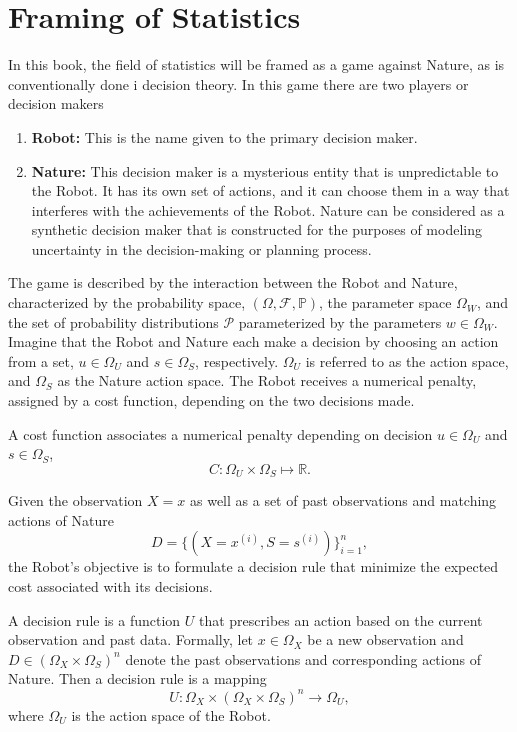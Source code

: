 \section{Framing of Statistics}
\label{sec:framing_statistics}
In this book, the field of statistics will be framed as a game against Nature, as is conventionally done i decision theory. In this game there are two players or decision makers
\begin{enumerate}
	\item \textbf{Robot:} This is the name given to the primary decision maker.
	
	\item \textbf{Nature:} This decision maker is a mysterious entity that is unpredictable to the Robot. It has its own set of actions, and it can choose them in a way that interferes with the achievements of the Robot. Nature can be considered as a synthetic decision maker that is constructed for the purposes of modeling uncertainty in the decision-making or planning process.
\end{enumerate}
The game is described by the interaction between the Robot and Nature, characterized by the probability space, $(\Omega, \mathcal{F}, \mathbb{P})$, the parameter space $\Omega_W$, and the set of probability distributions $\mathcal{P}$ parameterized by the parameters $w\in \Omega_W$. Imagine that the Robot and Nature each make a decision by choosing an action from a set, $u \in \Omega_U$ and $s \in \Omega_S$, respectively. $\Omega_U$ is referred to as the action space, and $\Omega_S$ as the Nature action space. The Robot receives a numerical penalty, assigned by a cost function, depending on the two decisions made.
\begin{definition}
	\label{def:cost_function}
	A cost function associates a numerical penalty depending on decision $u \in \Omega_U$ and $s \in \Omega_S$,
	\begin{equation}
		C: \Omega_U \times \Omega_S \mapsto \mathbb{R}.
	\end{equation}
\end{definition}
Given the observation $X=x$ as well as a set of past observations and matching actions of Nature
\begin{equation}
	D=\{(X = x^{(i)},S= s^{(i)})\}_{i=1}^n,
\end{equation}
the Robot's objective is to formulate a decision rule that minimize the expected cost associated with its decisions.
\begin{definition}
	\label{def:decision_rule}
	A decision rule is a function $U$ that prescribes an action based on the current observation and past data. Formally, let $x \in \Omega_X$ be a new observation and $D \in (\Omega_X \times \Omega_S)^n$ denote the past observations and corresponding actions of Nature. Then a decision rule is a mapping
	\begin{equation}
		U: \Omega_X \times (\Omega_X \times \Omega_S)^n \to \Omega_U,
	\end{equation}
	where $\Omega_U$ is the action space of the Robot.
\end{definition}

